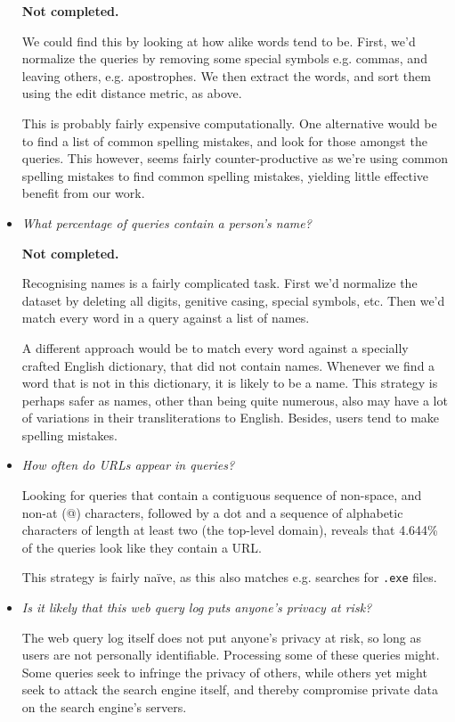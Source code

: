 \begin{itemize}
\textbf{Not completed.}

We could find this by looking at how alike words tend to be. First, we'd
normalize the queries by removing some special symbols e.g. commas, and leaving
others, e.g. apostrophes. We then extract the words, and sort them using the
edit distance metric, as above.

This is probably fairly expensive computationally. One alternative would be to
find a list of common spelling mistakes\footnotemark, and look for those
amongst the queries. This however, seems fairly counter-productive as we're
using common spelling mistakes to find common spelling mistakes, yielding
little effective benefit from our work.


\item \emph{What percentage of queries contain a person's name?}

\textbf{Not completed.}

Recognising names is a fairly complicated task. First we'd normalize the
dataset by deleting all digits, genitive casing, special symbols, etc. Then
we'd match every word in a query against a list of names.

A different approach would be to match every word against a specially crafted
English dictionary, that did not contain names. Whenever we find a word that is
not in this dictionary, it is likely to be a name. This strategy is perhaps
safer as names, other than being quite numerous, also may have a lot of
variations in their transliterations to English. Besides, users tend to make
spelling mistakes.

\item \emph{How often do URLs appear in queries?}

Looking for queries that contain a contiguous sequence of non-space, and non-at
(@) characters, followed by a dot and a sequence of alphabetic characters of
length at least two (the top-level domain), reveals that 4.644\% of the queries
look like they contain a URL.

This strategy is fairly na\"ive, as this also matches e.g. searches for
\texttt{.exe} files.

\item \emph{Is it likely that this web query log puts anyone's privacy at
risk?}

The web query log itself does not put anyone's privacy at risk, so long as
users are not personally identifiable. Processing some of these queries might.
Some queries seek to infringe the privacy of others, while others yet might
seek to attack the search engine itself, and thereby compromise private data on
the search engine's servers.


\end{itemize}

